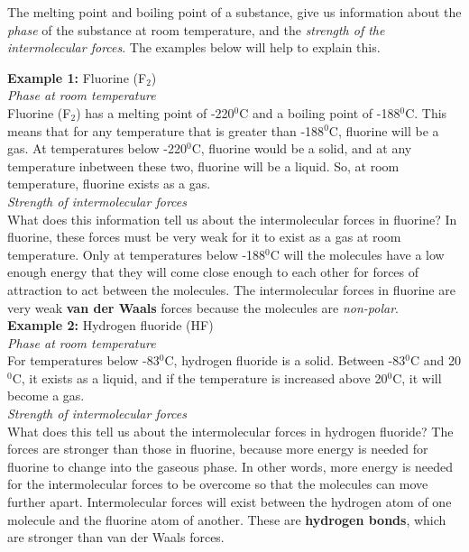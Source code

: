 The melting point and boiling point of a substance, give us information about the \textit{phase} of the substance at room temperature, and the \textit{strength of the intermolecular forces}. The examples below will help to explain this.

\textbf{Example 1:} Fluorine (F$_{2}$)\\

\textit{Phase at room temperature}\\

Fluorine (F$_{2}$) has a melting point of -220$^{0}$C and a boiling point of -188$^{0}$C. This means that for any temperature that is greater than -188$^{0}$C, fluorine will be a gas. At temperatures below -220$^{0}$C, fluorine would be a solid, and at any temperature inbetween these two, fluorine will be a liquid. So, at room temperature, fluorine exists as a gas.\\

\textit{Strength of intermolecular forces}\\

What does this information tell us about the intermolecular forces in fluorine? In fluorine, these forces must be very weak for it to exist as a gas at room temperature. Only at temperatures below -188$^{0}$C will the molecules have a low enough energy that they will come close enough to each other for forces of attraction to act between the molecules. The intermolecular forces in fluorine are very weak \textbf{van der Waals} forces because the molecules are \textit{non-polar}.\\

\textbf{Example 2:} Hydrogen fluoride (HF)\\

\textit{Phase at room temperature}\\

For temperatures below -83$^{0}$C, hydrogen fluoride is a solid. Between -83$^{0}$C and 20$^{0}$C, it exists as a liquid, and if the temperature is increased above 20$^{0}$C, it will become a gas.\\

\textit{Strength of intermolecular forces}\\

What does this tell us about the intermolecular forces in hydrogen fluoride? The forces are stronger than those in fluorine, because more energy is needed for fluorine to change into the gaseous phase. In other words, more energy is needed for the intermolecular forces to be overcome so that the molecules can move further apart. Intermolecular forces will exist between the hydrogen atom of one molecule and the fluorine atom of another. These are \textbf{hydrogen bonds}, which are stronger than van der Waals forces.\\

